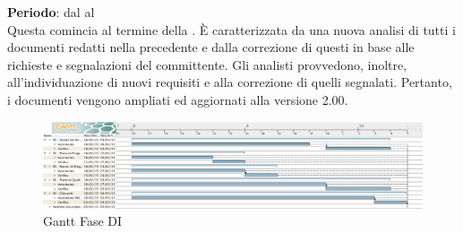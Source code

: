 \textbf{Periodo}: dal  al  \\
Questa  comincia al termine della . È caratterizzata da una nuova analisi di tutti i documenti redatti nella  precedente e dalla correzione di questi in base alle richieste e segnalazioni del committente. Gli analisti provvedono, inoltre, all'individuazione di nuovi requisiti e alla correzione di quelli segnalati. Pertanto, i documenti vengono ampliati ed aggiornati alla versione 2.00.
\begin{center}
	\begin{figure}[H]\centering
		\includegraphics[width=\textwidth]{PianoDiProgetto/Pics/FaseDI.png}
		\caption{Gantt Fase DI}
	\end{figure}
\end{center}

